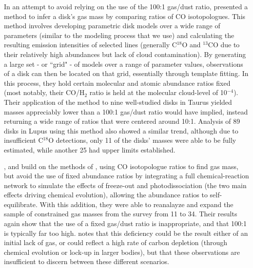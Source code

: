 In an attempt to avoid relying on the use of the 100:1 gas/dust ratio, \citet{WilliamsBest2014} presented a method to infer a disk's gas mass by comparing ratios of CO isotopologues. This method involves developing parametric disk models over a wide range of parameters (similar to the modeling process that we use) and calculating the resulting emission intensities of selected lines (generally C$^{18}$O and $^{13}$CO due to their relatively high abundances but lack of cloud contamination). By generating a large set - or ``grid" - of models over a range of parameter values, observations of a disk can then be located on that grid, essentially through template fitting. In this process, they hold certain molecular and atomic abundance ratios fixed (most notably, their CO/H$_2$ ratio is held at the molecular cloud-level of 10$^{-4}$). Their application of the method to nine well-studied disks in Taurus yielded masses appreciably lower than a 100:1 gas/dust ratio would have implied, instead returning a wide range of ratios that were centered around 10:1. Analysis of 89 disks in Lupus \citep{Ansdell2016} using this method also showed a similar trend, although due to insufficient C$^{18}$O detections, only 11 of the disks' masses were able to be fully estimated, while another 25 had upper limits established.

\citet{Miotello2014}, \citet{Miotello2016} and \citet{Miotello2017} build on the methods of \citet{WilliamsBest2014}, using CO isotopologue ratios to find gas mass, but avoid the use of fixed abundance ratios by integrating a full chemical-reaction network to simulate the effects of freeze-out and photodissociation (the two main effects driving chemical evolution), allowing the abundance ratios to self-equilibrate. With this addition, they were able to reanalayze and expand the sample of constrained gas masses from the \citet{Ansdell2016} survey from 11 to 34. Their results again show that the use of a fixed gas/dust ratio is inappropriate, and that 100:1 is typically far too high. \citet{Miotello2017} notes that this deficiency could be the result either of an initial lack of gas, or could reflect a high rate of carbon depletion (through chemical evolution or lock-up in larger bodies), but that these observations are insufficient to discern between these different scenarios.



